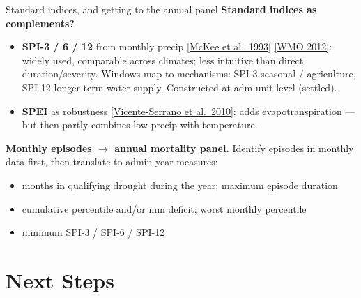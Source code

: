 \documentclass[10pt, aspectratio=169]{beamer}
\newcommand{\paperlink}[2]{\href{#1}{\textcolor{blue!50!black}{\footnotesize [#2]}}}
\begin{document}
\begin{frame}{Standard indices, and getting to the annual panel}
  \textbf{Standard indices as complements?}
  \begin{itemize}
    \item \textbf{SPI-3 / 6 / 12} from monthly precip
          \paperlink{https://climate.colostate.edu/pdfs/relationshipofdroughtfrequency.pdf}{McKee et al.\ 1993}
          \paperlink{https://library.wmo.int/idurl/4/39629}{WMO 2012}:
          widely used, comparable across climates; less intuitive than direct
          duration/severity. Windows map to mechanisms: SPI-3 seasonal /
          agriculture, SPI-12 longer-term water supply.
          Constructed at adm-unit level (settled).
    \item \textbf{SPEI} as robustness
          \paperlink{https://doi.org/10.1175/2009JCLI2909.1}{Vicente-Serrano et al.\ 2010}:
          adds evapotranspiration --- but then partly combines low precip with
          temperature.
  \end{itemize}
  \vspace{0.6em}
  \textbf{Monthly episodes $\rightarrow$ annual mortality panel.} Identify
  episodes in monthly data first, then translate to admin-year measures:
  \begin{itemize}
    \item months in qualifying drought during the year; maximum episode duration
    \item cumulative percentile and/or mm deficit; worst monthly percentile
    \item minimum SPI-3 / SPI-6 / SPI-12
  \end{itemize}
\end{frame}

\section{Next Steps}
\end{document}
